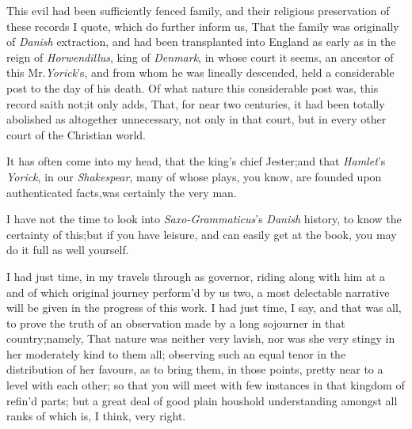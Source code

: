 \documentclass{article}
\begin{document}
\vspace\parskip
This evil had been sufficiently fenced 
family, and their religious
preservation of these records I quote, which do further inform us,
That the family was originally of \textit{Danish} extraction, and had
been transplanted into England as early as in the reign of
\textit{Horwendillus}, king of \textit{Denmark}, in whose court it
seems, an ancestor of this Mr.\@ \textit{Yorick}’s, and from whom
he was lineally descended, held a considerable post to the day of
his death. Of what nature this considerable post was, this record
saith not;\tsk  it only adds, That, for near two centuries, it had
been totally abolished as altogether unnecessary, not only in that
court, but in every other court of the Christian world.

It has often come into my head, that 
the king’s chief Jester;\tsk  and that
\textit{Hamlet}’s \textit{Yorick}, in our \textit{Shakespear},
many of whose plays, you know, are founded up\-on authenticated
facts,\tsk was certainly the very man.

I have not the time to look into \textit{Saxo-Grammaticus}’s
\textit{Danish} history, to know the certainty of this;\tsk  but if
you have leisure, and can easily get at the book, you may do
it full as well yourself.

I had just time, in my travels through 
as governor, riding along with him at a
and of which original journey
perform’d by us two, a most delectable narrative will be given in
the progress of this work.\break
I had just time, I say, and that was
all, to prove the truth of an observation made by a long sojourner
in that country;\tsh\break namely, \lqq That nature was
neither very lavish, nor was she very stingy in her\break
{}
moderately kind to them all; observing such an equal tenor in
the distribution of her favours, as to bring them, in those points,
pretty near to a level with each other; so that you will meet with
few instances in that kingdom of refin’d parts; but a great
deal of good plain hous\-hold understanding amongst all
ranks of
which is, I think, very right.
\end{document}
